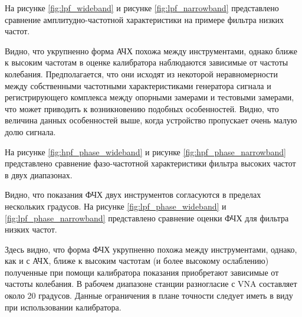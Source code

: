 \documentclass{report}
\begin{document}
На рисунке \ref{fig:lpf_wideband} и рисунке \ref{fig:lpf_narrowband} представлено сравнение амплитудно-частотной характеристики на примере фильтра низких частот.



Видно, что укрупненно форма АЧХ похожа между инструментами, однако ближе к высоким частотам в оценке калибратора наблюдаются зависимые от частоты колебания. Предполагается, что они исходят из некоторой неравномерности между собственными частотными характеристиками генератора сигнала и регистрирующего комплекса между опорными замерами и тестовыми замерами, что может приводить к возникновению подобных особенностей. Видно, что величина данных особенностей выше, когда устройство пропускает очень малую долю сигнала.

На рисунке \ref{fig:hpf_phase_wideband} и рисунке \ref{fig:hpf_phase_narrowband} представлено сравнение фазо-частотной характеристики фильтра высоких частот в двух диапазонах.



Видно, что показания ФЧХ двух инструментов согласуются в пределах нескольких градусов. На рисунке \ref{fig:lpf_phase_wideband} и \ref{fig:lpf_phase_narrowband} представлено сравнение оценки ФЧХ для фильтра низких частот.



Здесь видно, что форма ФЧХ укрупненно похожа между инструментами, однако, как и с АЧХ, ближе к высоким частотам (и более высокому ослаблению) полученные при помощи калибратора показания приобретают зависимые от частоты колебания. В рабочем диапазоне станции разногласие с VNA составляет около 20 градусов. Данные ограничения в плане точности следует иметь в виду при использовании калибратора.
\end{document}
